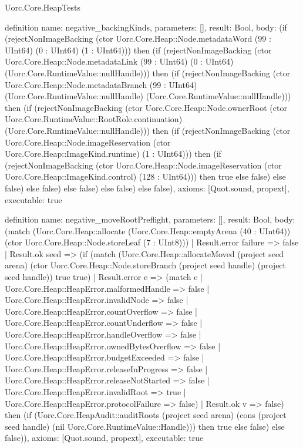 \begin{lexlean}{Uorc.Core.HeapTests}
\begin{semanticmodule}
definition{
  name: negative_backingKinds,
  parameters: [],
  result: Bool,
  body: (if (rejectNonImageBacking (ctor Uorc.Core.Heap::Node.metadataWord (99 : UInt64) (0 : UInt64) (1 : UInt64))) then (if (rejectNonImageBacking (ctor Uorc.Core.Heap::Node.metadataLink (99 : UInt64) (0 : UInt64) (Uorc.Core.RuntimeValue::nullHandle))) then (if (rejectNonImageBacking (ctor Uorc.Core.Heap::Node.metadataBranch (99 : UInt64) (Uorc.Core.RuntimeValue::nullHandle) (Uorc.Core.RuntimeValue::nullHandle))) then (if (rejectNonImageBacking (ctor Uorc.Core.Heap::Node.ownerRoot (ctor Uorc.Core.RuntimeValue::RootRole.continuation) (Uorc.Core.RuntimeValue::nullHandle))) then (if (rejectNonImageBacking (ctor Uorc.Core.Heap::Node.imageReservation (ctor Uorc.Core.Heap::ImageKind.runtime) (1 : UInt64))) then (if (rejectNonImageBacking (ctor Uorc.Core.Heap::Node.imageReservation (ctor Uorc.Core.Heap::ImageKind.control) (128 : UInt64))) then true else false) else false) else false) else false) else false) else false),
  axioms: [Quot.sound, propext],
  executable: true
}

definition{
  name: negative_moveRootPreflight,
  parameters: [],
  result: Bool,
  body: (match (Uorc.Core.Heap::allocate (Uorc.Core.Heap::emptyArena (40 : UInt64)) (ctor Uorc.Core.Heap::Node.storeLeaf (7 : UInt8)))
    | Result.error failure => false
    | Result.ok seed => (if (match (Uorc.Core.Heap::allocateMoved (project seed arena) (ctor Uorc.Core.Heap::Node.storeBranch (project seed handle) (project seed handle)) true true)
      | Result.error e => (match e
        | Uorc.Core.Heap::HeapError.malformedHandle => false
        | Uorc.Core.Heap::HeapError.invalidNode => false
        | Uorc.Core.Heap::HeapError.countOverflow => false
        | Uorc.Core.Heap::HeapError.countUnderflow => false
        | Uorc.Core.Heap::HeapError.handleOverflow => false
        | Uorc.Core.Heap::HeapError.ownedBytesOverflow => false
        | Uorc.Core.Heap::HeapError.budgetExceeded => false
        | Uorc.Core.Heap::HeapError.releaseInProgress => false
        | Uorc.Core.Heap::HeapError.releaseNotStarted => false
        | Uorc.Core.Heap::HeapError.invalidRoot => true
        | Uorc.Core.Heap::HeapError.protocolFailure => false)
      | Result.ok v => false) then (if (Uorc.Core.HeapAudit::auditRoots (project seed arena) (cons (project seed handle) (nil Uorc.Core.RuntimeValue::Handle))) then true else false) else false)),
  axioms: [Quot.sound, propext],
  executable: true
}


\end{semanticmodule}
\end{lexlean}
